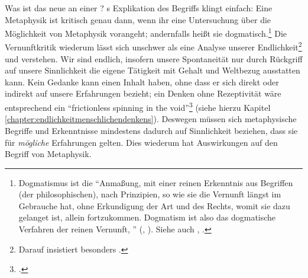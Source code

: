Was ist das neue an einer ?
s Explikation des Begriffs klingt einfach: Eine Metaphysik
ist kritisch genau dann, wenn ihr eine Untersuchung über die Möglichkeit von
Metaphysik vorangeht; andernfalls heißt sie dogmatisch.\footnote{Dogmatismus ist
die \enquote{Anmaßung, mit einer reinen Erkenntnis aus Begriffen (der
philosophischen), nach Prinzipien, so wie sie die Vernunft längst im Gebrauche
hat, ohne Erkundigung der Art und des Rechts, womit sie dazu gelanget ist,
allein fortzukommen. Dogmatism ist also das dogmatische Verfahren der reinen
Vernunft, }
\mkbibparens{\cite[][B xxxv]{Kant:KritikderreinenVernunft2003}, \cite[][III:
21.27--30 ]{Kant:GesammelteWerke1900ff.}}. Siehe auch
\cite[][B 7]{Kant:KritikderreinenVernunft2003},
\cite[][III: 31.7--12]{Kant:GesammelteWerke1900ff.}.} Die Vernunftkritik
wiederum lässt sich unschwer als eine Analyse unserer
Endlichkeit\footnote{Darauf insistiert besonders 
\parencite[vgl.][\S~5 und
passim]{Heidegger:KantunddasProblemderMetaphysik1965}.} und verstehen. Wir sind
endlich, insofern unsere Spontaneität nur durch Rückgriff auf unsere
Sinnlichkeit die eigene Tätigkeit mit Gehalt und Weltbezug ausstatten kann. Kein
Gedanke kann einen Inhalt haben, ohne dass er sich direkt oder indirekt auf
unsere Erfahrungen bezieht; ein Denken ohne Rezeptivität wäre entsprechend ein
\enquote{frictionless spinning in the
void}\footnote{\cite[][11]{McDowell:MindandWorld1994}.} (siehe hierzu Kapitel
\ref{chapter:endlichkeitmenschlichendenkens}).
Deswegen müssen sich metaphysische Begriffe und Erkenntnisse mindestens dadurch auf Sinnlichkeit
beziehen, dass sie für \emph{mögliche} Erfahrungen gelten.
Dies wiederum hat Auswirkungen auf den Begriff von Metaphysik.


